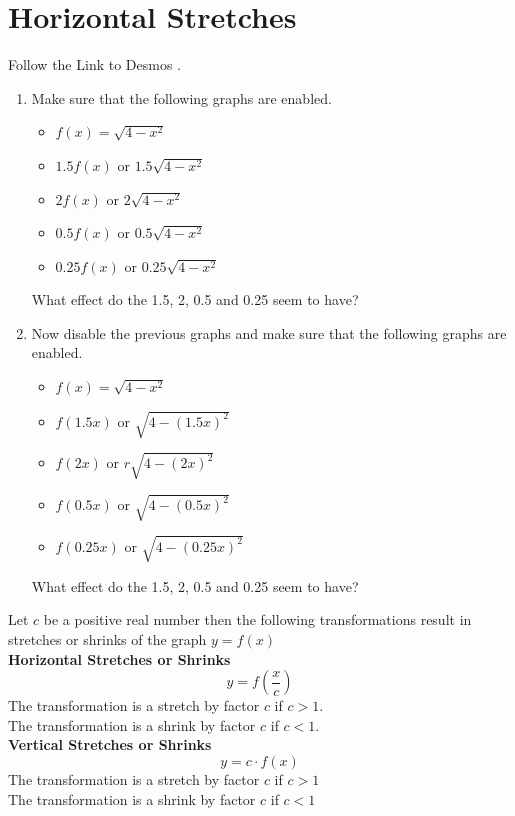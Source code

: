 \documentclass[handout, noauthor, nooutcomes]{ximera}
\begin{document}
\section{Horizontal Stretches}
\begin{exploration}
Follow the Link to Desmos . 
\begin{enumerate}
\item Make sure that the following graphs are enabled.
\begin{itemize}
\item $f(x) = \sqrt{4-x^2}$ 
\item $1.5f(x) \text{ or } 1.5\sqrt{4-x^2} $
\item $2f(x) \text{ or } 2\sqrt{4-x^2}$
\item $0.5f(x) \text{ or } 0.5\sqrt{4-x^2}$
\item $0.25f(x) \text{ or } 0.25\sqrt{4-x^2}$
\end{itemize}
What effect do the 1.5, 2, 0.5 and 0.25 seem to have?
\item Now disable the previous graphs and make sure that the following graphs are enabled.
\begin{itemize}
\item $f(x) = \sqrt{4-x^2}$ 
\item $f(1.5x) \text{ or } \sqrt{4-(1.5x)^2}$
\item $f(2x) \text{ or }r \sqrt{4-(2x)^2}$
\item $f(0.5x) \text{ or } \sqrt{4-(0.5x)^2}$
\item $f(0.25x) \text{ or } \sqrt{4-(0.25x)^2}$
\end{itemize}
What effect do the 1.5, 2, 0.5 and 0.25 seem to have?
\end{enumerate}
\end{exploration}
\begin{callout}
Let $c$ be a positive real number then the following transformations result in stretches or shrinks of the graph $y = f(x)$\\
\textbf{Horizontal Stretches or Shrinks}
\[
y=f\left(\frac{x}{c}\right)
\]
The transformation is a stretch by factor $c$ if $c>1$.\\
The transformation is a shrink by factor $c$ if $c<1$.\\
\textbf{Vertical Stretches or Shrinks}
\[
y=c \cdot f(x)
\]
The transformation is a stretch by factor $c$ if $c>1$\\
The transformation is a shrink by factor $c$ if $c<1$
\end{callout}
\end{document}
